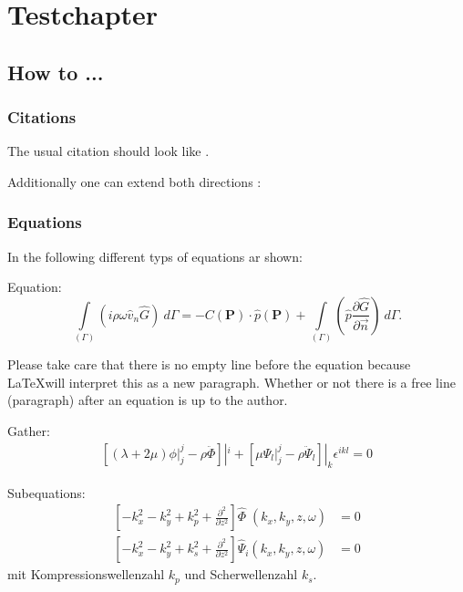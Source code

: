 \chapter{Testchapter}
\label{cha:beispiele}

\section{How to ...}
\label{sec:chief}

\subsection{Citations}
\label{sec:citations}
The usual citation should look like \citep{Stroud1966}.

Additionally one can extend both directions \citep[before][after p.1-3]{Stroud1966}: 
\citep{Unknown2018}


\subsection{Equations}
\label{sec:equations}
In the following different typs of equations ar shown:

Equation:
%
\begin{equation}
		\int\limits_{(\Gamma)} \left( i \rho \omega \hat{v}_{n} \hat{G}\right)~d\Gamma  = - C(\mathbf{P}) \cdot \hat{p}(\mathbf{P})  + \int\limits_{(\Gamma)} \left(\hat{p} \frac{\partial \hat{G}}{\partial \vec{n}}\right)~d\Gamma.
	\label{eq:chief1}
\end{equation}

Please take care that there is no empty line before the equation because \LaTeX will interpret this as a new paragraph. Whether or not there is a free line (paragraph) after an equation is up to the author.

Gather:
\begin{gather}
\left[(\lambda+2\mu)\phi|^j_j-\rho\ddot{\Phi}\right]|^i+\left[\mu\Psi_l|_j^j-\rho\ddot{\Psi}_l\right]|_k\epsilon^{ikl}=0
\end{gather}

Subequations:
\begin{subequations}\label{eq:Wellengleichung_FT}
\begin{align}
		 \left[-k_x^2 - k_y^2 + k_p^2 +\frac{\partial ^2}{\partial z^2}\right]\hat{\Phi} \;(k_x,k_y,z,\omega) &= 0 \label{eq:2.5}\\[10pt]
		 \left[-k_x^2 - k_y^2 + k_s^2 +\frac{\partial ^2}{\partial z^2}\right]\hat{\Psi}_i(k_x,k_y,z,\omega) &= 0 \label{eq:2.6}
\end{align}
\end{subequations}
mit Kompressionswellenzahl $k_p$ und Scherwellenzahl $k_s$.

